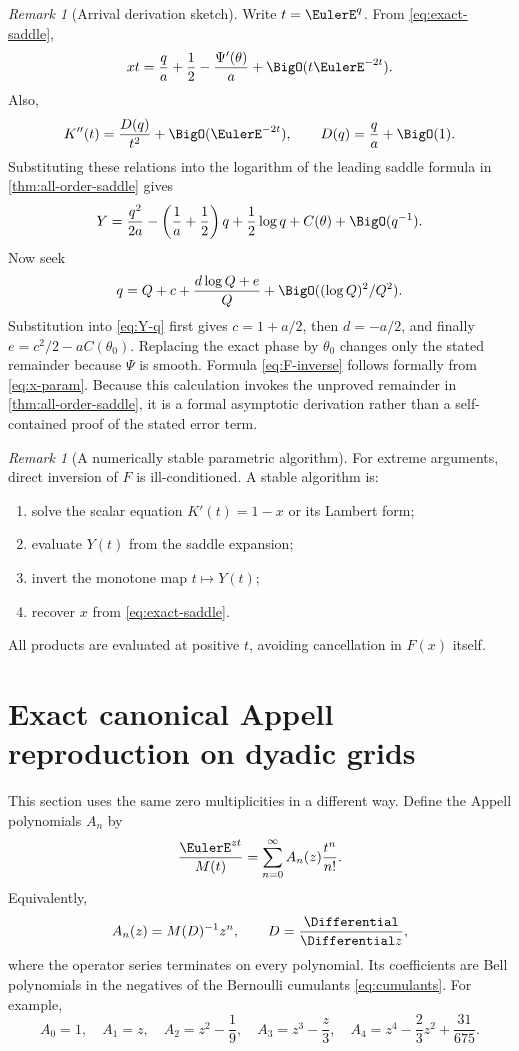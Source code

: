 \documentclass[11pt,oneside]{article}
\theoremstyle{definition}
\theoremstyle{remark}
\newtheorem{remark}[theorem]{Remark}
\begin{document}
\begin{remark}[Arrival derivation sketch]
Write \(t=\EulerE^q\).  From \eqref{eq:exact-saddle},
\[
 xt=\frac q a+\frac12-\frac{\Psi'(\theta)}a+\BigO(t\EulerE^{-2t}).
 \label{eq:x-param}
\]
Also,
\[
 K''(t)
 =\frac{D(q)}{t^2}+\BigO(\EulerE^{-2t}),
 \qquad
 D(q)=\frac q a+\BigO(1).
\]
Substituting these relations into the logarithm of the leading saddle formula
in \cref{thm:all-order-saddle} gives
\begin{equation}
 Y
 =\frac{q^2}{2a}
  -\left(\frac1a+\frac12\right)q
  +\frac12\log q
  +C(\theta)
  +\BigO(q^{-1}).
 \label{eq:Y-q}
\end{equation}
Now seek
\[
 q=Q+c+\frac{d\log Q+e}{Q}
   +\BigO((\log Q)^2/Q^2).
\]
Substitution into \eqref{eq:Y-q} first gives
\(c=1+a/2\), then \(d=-a/2\), and finally
\(e=c^2/2-aC(\theta_0)\).  Replacing the exact phase by \(\theta_0\)
changes only the stated remainder because \(\Psi\) is smooth.  Formula
\eqref{eq:F-inverse} follows formally from \eqref{eq:x-param}.  Because this
calculation invokes the unproved remainder in
\cref{thm:all-order-saddle}, it is a formal asymptotic derivation rather than
a self-contained proof of the stated error term.
\end{remark}

\begin{remark}[A numerically stable parametric algorithm]
For extreme arguments, direct inversion of \(F\) is ill-conditioned.
A stable algorithm is:
\begin{enumerate}[label=\arabic*.,leftmargin=2em]
\item solve the scalar equation \(K'(t)=1-x\) or its Lambert form;
\item evaluate \(Y(t)\) from the saddle expansion;
\item invert the monotone map \(t\mapsto Y(t)\);
\item recover \(x\) from \eqref{eq:exact-saddle}.
\end{enumerate}
All products are evaluated at positive \(t\), avoiding cancellation in
\(F(x)\) itself.
\end{remark}

\section{Exact canonical Appell reproduction on dyadic grids}

This section uses the same zero multiplicities in a different way.  Define
the Appell polynomials \(A_n\) by
\begin{equation}
 \frac{\EulerE^{zt}}{M(t)}
 =\sum_{n=0}^{\infty}A_n(z)\frac{t^n}{n!}.
 \label{eq:Appell}
\end{equation}
Equivalently,
\begin{equation}
 A_n(z)=M(D)^{-1}z^n,\qquad D=\frac{\Differential}{\Differential z},
 \label{eq:Appell-operator}
\end{equation}
where the operator series terminates on every polynomial.  Its coefficients
are Bell polynomials in the negatives of the Bernoulli cumulants
\eqref{eq:cumulants}.  For example,
\[
 A_0=1,\quad A_1=z,\quad
 A_2=z^2-\frac19,\quad
 A_3=z^3-\frac z3,\quad
 A_4=z^4-\frac23z^2+\frac{31}{675}.
\]
\end{document}
